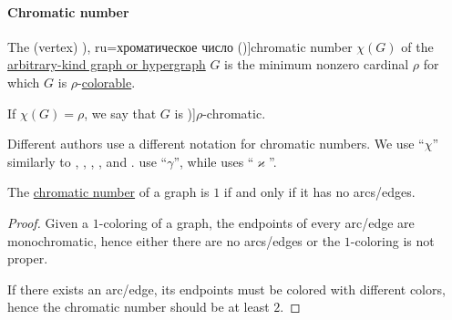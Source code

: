 \paragraph{Chromatic number}

\begin{definition}\label{def:graph_chromatic_number}
  The (vertex) \term[bg=хроматично число (\cite[142]{Мирчев2001Графи}), ru=хроматическое число (\cite[235]{ЕмеличевИПр1990ТеорияГрафов})]{chromatic number} \( \chi(G) \) of the \hyperref[rem:arbitrary_kind_graph]{arbitrary-kind graph or hypergraph} \( G \) is the minimum nonzero cardinal \( \rho \) for which \( G \) is \( \rho \)-\hyperref[def:graph_coloring/colorable]{colorable}.

  If \( \chi(G) = \rho \), we say that \( G \) is \term[ru=\( \rho \)-хроматический (граф) (\cite[236]{ЕмеличевИПр1990ТеорияГрафов})]{\( \rho \)-chromatic}.
\end{definition}
\begin{comments}
  \item Different authors use a different notation for chromatic numbers. We use \enquote{\( \chi \)} similarly to , , , ,  and .  use \enquote{\( \gamma \)}, while  uses \enquote{\( \varkappa \)}.
\end{comments}

\begin{proposition}\label{thm:chromatic_number_edgeless}
  The \hyperref[def:graph_chromatic_number]{chromatic number} of a graph is \( 1 \) if and only if it has no arcs/edges.
\end{proposition}
\begin{proof}
  \SufficiencySubProof Given a \( 1 \)-coloring of a graph, the endpoints of every arc/edge are monochromatic, hence either there are no arcs/edges or the \( 1 \)-coloring is not proper.

  \NecessitySubProof If there exists an arc/edge, its endpoints must be colored with different colors, hence the chromatic number should be at least \( 2 \).
\end{proof}

